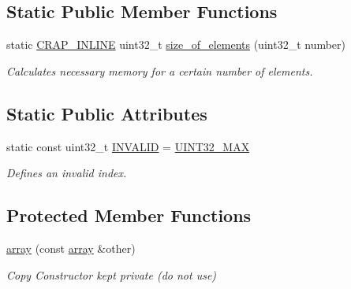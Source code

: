 \subsection*{Static Public Member Functions}
\begin{DoxyCompactItemize}
\item 
static \hyperlink{config__x86_8h_a5a40526b8d842e7ff731509998bb0f1c}{C\+R\+A\+P\+\_\+\+I\+N\+L\+I\+N\+E} uint32\+\_\+t \hyperlink{classcrap_1_1array_ae08a075c532e141fa05a756542d9b4df}{size\+\_\+of\+\_\+elements} (uint32\+\_\+t number)
\begin{DoxyCompactList}\small\item\em Calculates necessary memory for a certain number of elements. \end{DoxyCompactList}\end{DoxyCompactItemize}
\subsection*{Static Public Attributes}
\begin{DoxyCompactItemize}
\item 
static const uint32\+\_\+t \hyperlink{classcrap_1_1array_a9ad63bb5c848f0ba7ebef098a8b3a6ab}{I\+N\+V\+A\+L\+I\+D} = \hyperlink{crap__types_8h_ab5eb23180f7cc12b7d6c04a8ec067fdd}{U\+I\+N\+T32\+\_\+\+M\+A\+X}
\begin{DoxyCompactList}\small\item\em Defines an invalid index. \end{DoxyCompactList}\end{DoxyCompactItemize}
\subsection*{Protected Member Functions}
\begin{DoxyCompactItemize}
\item 
\hyperlink{classcrap_1_1array_a1813afbbcf7465a93b05f828b98498c9}{array} (const \hyperlink{classcrap_1_1array}{array} \&other)
\begin{DoxyCompactList}\small\item\em Copy Constructor kept private (do not use) \end{DoxyCompactList}\end{DoxyCompactItemize}
